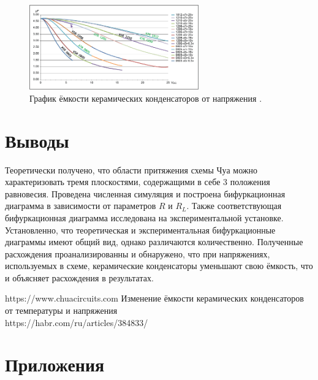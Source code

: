 \documentclass[12pt]{article}
\begin{document}
\begin{figure}[H]
	\centering
	\includegraphics[width=0.65\textwidth]{decrease_graph.png}
	\caption{График ёмкости керамических конденсаторов от напряжения \cite{Habr_C}.}
	\label{fig:C_decrease}
\end{figure}

\section*{Выводы}
Теоретически получено, что области притяжения схемы Чуа можно характеризовать тремя плоскостями, содержащими в себе 3 положения равновесия. 
Проведена численная симуляция и построена бифуркационная диаграмма в зависимости от параметров $R$ и $R_L$. Также соответствующая бифуркационная 
диаграмма исследована на экспериментальной установке. Установленно, что теоретическая и экспериментальная бифуркационные диаграммы имеют общий вид, однако 
различаются количественно. Полученные расхождения проанализированны и обнаружено, что при напряжениях, используемых в схеме, керамические конденсаторы 
уменьшают свою ёмкость, что и объясняет расхождения в результатах. 

\begin{thebibliography}{9}
	https://www.chuacircuits.com
	Изменение ёмкости керамических конденсаторов от температуры и напряжения \\ https://habr.com/ru/articles/384833/
\end{thebibliography}

\section*{Приложения}
\end{document}
